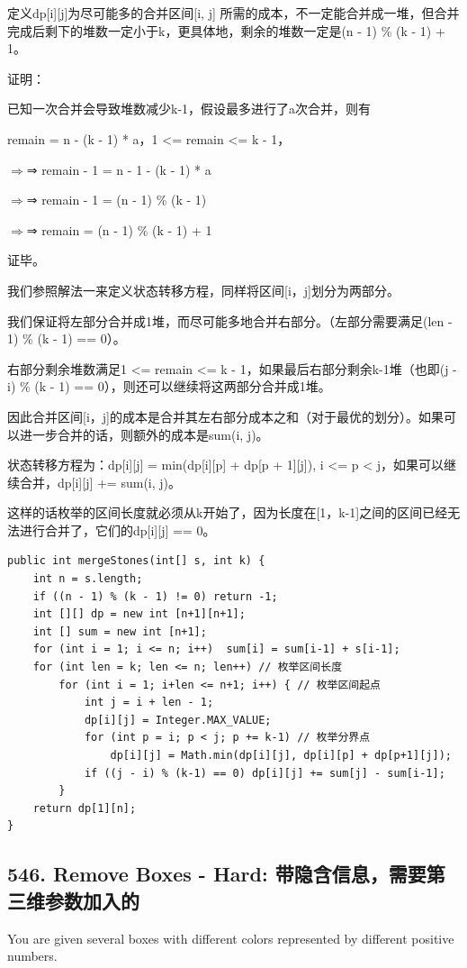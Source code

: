 \documentclass[9pt, b5paaper]{book}
\begin{document}
\begin{enumerate}
定义dp[i][j]为尽可能多的合并区间[i, j] 所需的成本，不一定能合并成一堆，但合并完成后剩下的堆数一定小于k，更具体地，剩余的堆数一定是(n - 1) \% (k - 1) + 1。

证明：

已知一次合并会导致堆数减少k-1，假设最多进行了a次合并，则有

remain = n - (k - 1) * a，1 <= remain <= k - 1，

$\Rightarrow$⇒ remain - 1 = n - 1 - (k - 1) * a

$\Rightarrow$⇒ remain - 1 = (n - 1) \% (k - 1)

$\Rightarrow$⇒ remain = (n - 1) \% (k - 1) + 1

证毕。

我们参照解法一来定义状态转移方程，同样将区间[i，j]划分为两部分。

我们保证将左部分合并成1堆，而尽可能多地合并右部分。（左部分需要满足(len - 1) \% (k - 1) == 0）。

右部分剩余堆数满足1 <= remain <= k - 1，如果最后右部分剩余k-1堆（也即(j - i) \% (k - 1) == 0），则还可以继续将这两部分合并成1堆。

因此合并区间[i，j]的成本是合并其左右部分成本之和（对于最优的划分）。如果可以进一步合并的话，则额外的成本是sum(i, j)。

状态转移方程为：dp[i][j] = min(dp[i][p] + dp[p + 1][j]), i <= p < j，如果可以继续合并，dp[i][j] += sum(i, j)。

这样的话枚举的区间长度就必须从k开始了，因为长度在[1，k-1]之间的区间已经无法进行合并了，它们的dp[i][j] == 0。

\begin{verbatim}
public int mergeStones(int[] s, int k) {
    int n = s.length;
    if ((n - 1) % (k - 1) != 0) return -1;
    int [][] dp = new int [n+1][n+1];
    int [] sum = new int [n+1];
    for (int i = 1; i <= n; i++)  sum[i] = sum[i-1] + s[i-1];
    for (int len = k; len <= n; len++) // 枚举区间长度
        for (int i = 1; i+len <= n+1; i++) { // 枚举区间起点
            int j = i + len - 1;
            dp[i][j] = Integer.MAX_VALUE;
            for (int p = i; p < j; p += k-1) // 枚举分界点
                dp[i][j] = Math.min(dp[i][j], dp[i][p] + dp[p+1][j]);
            if ((j - i) % (k-1) == 0) dp[i][j] += sum[j] - sum[i-1];
        }
    return dp[1][n];
}
\end{verbatim}
\end{enumerate}

\subsection{546. Remove Boxes - Hard: 带隐含信息，需要第三维参数加入的}
\label{sec-1-3-5}
You are given several boxes with different colors represented by different positive numbers.
\end{document}
